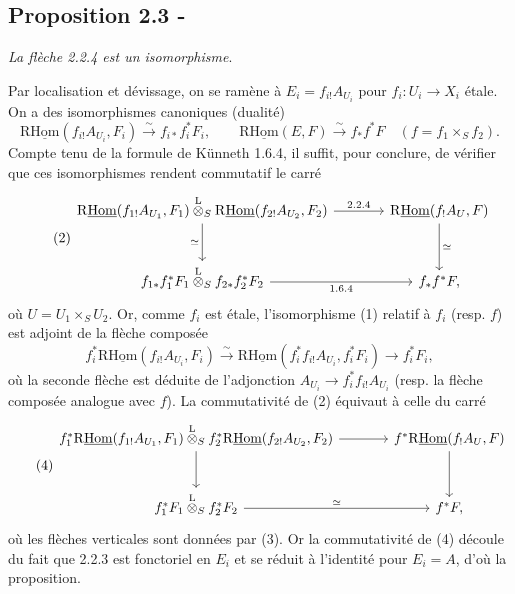 \subsection*{Proposition 2.3 -}
\emph{La flèche 2.2.4 est un isomorphisme}.

Par localisation et dévissage, on se ramène à $E_i=f_{i!}A_{U_i}$ pour $f_i:U_i\to X_i$ étale. On a des isomorphismes canoniques (dualité)
\begin{equation}\tag{1}
\mathrm{R}\underline{\mathrm{Hom}}(f_{i!}A_{U_i},F_i)\xrightarrow{\sim}f_{i*}f_i^{*}F_i,
\qquad
\mathrm{R}\underline{\mathrm{Hom}}(E,F)\xrightarrow{\sim}f_{*}f^{*}F\quad(f=f_1\times_S f_2).
\end{equation}
Compte tenu de la formule de Künneth 1.6.4, il suffit, pour conclure, de vérifier que ces isomorphismes rendent commutatif le carré
\begin{equation}\tag{2}
\begin{tikzcd}[column sep=large,row sep=large]
\mathrm{R}\underline{\mathrm{Hom}}(f_{1!}A_{U_1},F_1)\overset{\mathrm{L}}{\otimes}_{S}\mathrm{R}\underline{\mathrm{Hom}}(f_{2!}A_{U_2},F_2) \arrow[r,"2.2.4"] \arrow[d,"\simeq"'] & \mathrm{R}\underline{\mathrm{Hom}}(f_{!}A_U,F) \arrow[d,"\simeq"]\\
f_{1*}f_1^{*}F_1\overset{\mathrm{L}}{\otimes}_{S}f_{2*}f_2^{*}F_2 \arrow[r,"1.6.4"'] & f_{*}f^{*}F,
\end{tikzcd}
\end{equation}
où $U=U_1\times_S U_2$. Or, comme $f_i$ est étale, l'isomorphisme (1) relatif à $f_i$ (resp. $f$) est adjoint de la flèche composée
\begin{equation}\tag{3}
f_i^{*}\mathrm{R}\underline{\mathrm{Hom}}(f_{i!}A_{U_i},F_i)\xrightarrow{\sim}\mathrm{R}\underline{\mathrm{Hom}}(f_i^{*}f_{i!}A_{U_i},f_i^{*}F_i)\longrightarrow f_i^{*}F_i,
\end{equation}
où la seconde flèche est déduite de l'adjonction $A_{U_i}\to f_i^{*}f_{i!}A_{U_i}$ (resp. la flèche composée analogue avec $f$). La commutativité de (2) équivaut à celle du carré
\begin{equation}\tag{4}
\begin{tikzcd}[column sep=large,row sep=large]
f_1^{*}\mathrm{R}\underline{\mathrm{Hom}}(f_{1!}A_{U_1},F_1)\overset{\mathrm{L}}{\otimes}_{S}f_2^{*}\mathrm{R}\underline{\mathrm{Hom}}(f_{2!}A_{U_2},F_2) \arrow[r] \arrow[d] & f^{*}\mathrm{R}\underline{\mathrm{Hom}}(f_{!}A_U,F) \arrow[d]\\
f_1^{*}F_1\overset{\mathrm{L}}{\otimes}_{S}f_2^{*}F_2 \arrow[r,"\simeq"] & f^{*}F,
\end{tikzcd}
\end{equation}
où les flèches verticales sont données par (3). Or la commutativité de (4) découle du fait que 2.2.3 est fonctoriel en $E_i$ et se réduit à l'identité pour $E_i=A$, d'où la proposition.

